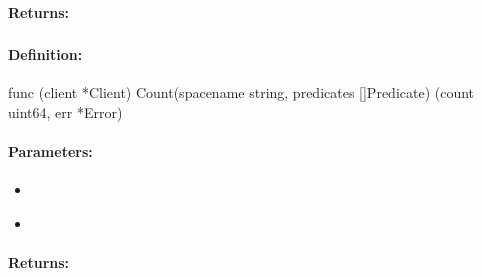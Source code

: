 \paragraph{Returns:}


\pagebreak
\subsubsection{}
\label{api:Go:Count}


\paragraph{Definition:}
\begin{gocode}
func (client *Client) Count(spacename string, predicates []Predicate) (count uint64, err *Error)
\end{gocode}

\paragraph{Parameters:}
\begin{itemize}[noitemsep]
\item {}\\

\item {}\\

\end{itemize}

\paragraph{Returns:}

